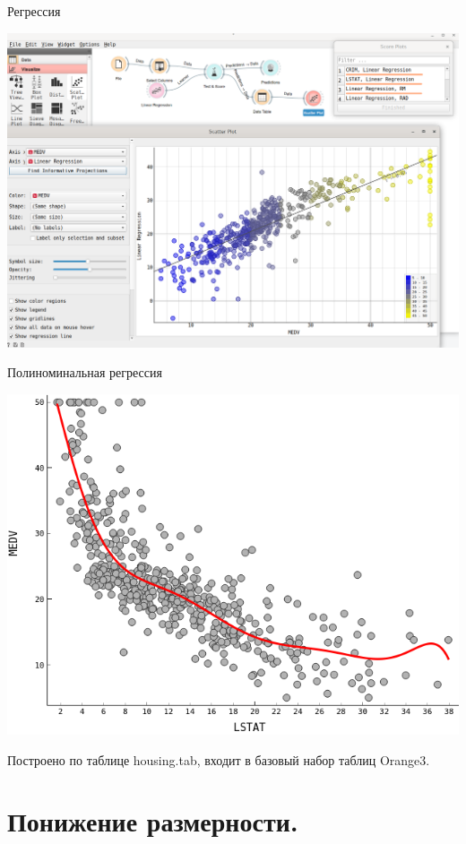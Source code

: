 \documentclass{beamer}
\begin{document}
\begin{frame}{Регрессия}

\includegraphics[scale=0.2]{ris_04.png}

\end{frame}


\begin{frame}{Полиноминальная регрессия}

\includegraphics[scale=0.5]{ris_05.png}

Построено по таблице housing.tab, входит в базовый набор таблиц Orange3.
\end{frame}


\section{Понижение размерности.}
\end{document}
